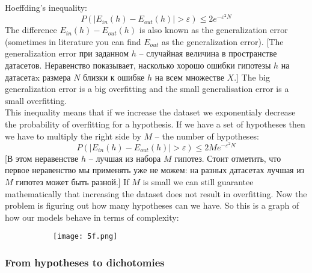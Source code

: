 Hoeffding's inequality:
\hypertarget{gen_error}{}
$$P(|E_{in}(h)-E_{out}(h)|>\varepsilon)\le2e^{-\varepsilon^2N}$$
The difference $E_{in}(h)-E_{out}(h)$ is also known as the generalization error (sometimes in literature you can find $E_{out}$ as the generalization error). [The generalization error при заданном $h$ -- случайная величина в пространстве датасетов. Неравенство показывает, насколько хорошо ошибки гипотезы $h$ на датасетаx размера $N$ близки к ошибке $h$ на всем множестве $X$.] The big generalization error is a big overfitting and the small generalisation error is a small overfitting.\\
This inequality means that if we increase the dataset we exponentialy decrease the probability of overfitting for a hypothesis. If we have a set of hypotheses then we have to multiply the right side by $M$ -- the number of hypotheses: 
$$P(|E_{in}(h)-E_{out}(h)|>\varepsilon)\le 2Me^{-\varepsilon^2N}$$
[В этом неравенстве $h$ -- лучшая из набора $M$ гипотез. Стоит отметить, что первое неравенство мы применять уже не можем: на разных датасетах лучшая из $M$ гипотез может быть разной.] If $M$ is small we can still guarantee mathematically that increasing the dataset does not result in overfitting. Now the problem is figuring out how many hypotheses can we have. So this is a graph of how our models behave in terms of complexity:
\begin{figure}[h!]
  \centering
  \begin{subfigure}[l]{0.7\linewidth}
    \texttt{[image: 5f.png]}
  \end{subfigure}
\end{figure}

\subsubsection*{From hypotheses to dichotomies}

